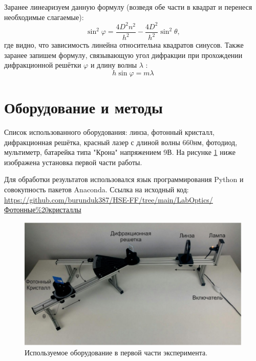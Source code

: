 \documentclass[a4paper, 12pt]{article}
\renewcommand{\phi}{\varphi} %
\begin{document}
	Заранее линеаризуем данную формулу (возведя обе части в квадрат и перенеся необходимые слагаемые):
	\begin{equation}\label{linear}
	\sin^{2}{\phi}=\frac{4D^{2}n^{2}}{h^2}-\frac{4D^{2}}{h^{2}}\sin^{2}{\theta},
	\end{equation}
	где видно, что зависимость линейна относительна квадратов синусов.
	Также заранее запишем формулу, связывающую угол дифракции при
	прохождении дифракционной решётки $\phi$ и длину волны $\lambda$ :
	\begin{equation}\label{diflen}
	h\sin{\phi} = m\lambda
	\end{equation}
	\section*{Оборудование и методы}
	Список использованного оборудования: линза, фотонный кристалл, дифракционная решётка, красный лазер с длиной волны 660нм, фотодиод, мультиметр, батарейка типа "Крона" напряжением 9В. На рисунке \ref{fig:2} ниже изображена установка первой части работы.
	
	Для обработки результатов использовался язык программирования Python и совокупность пакетов Anaconda.
	Ссылка на исходный код:
	\newline \href{https://github.com/burunduk387/HSE-FF/tree/main/LabOptics/Фотонные\%20кристаллы}{https://github.com/burunduk387/HSE-FF/tree/main/LabOptics/Фотонные\%20кристаллы}
	\begin{figure}[H]
		\centering
		\includegraphics[width=1\linewidth]{Equip.png}
		\caption{Используемое оборудование в первой части эксперимента.}
		\label{fig:2}
	\end{figure}
\end{document}

